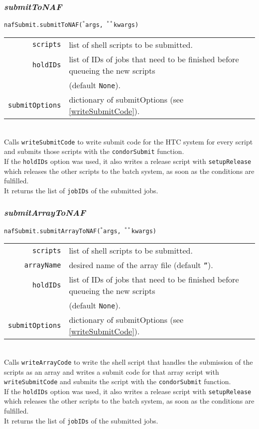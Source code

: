 \documentclass[12pt, a4paper]{article}
\newcommand{\args}{$^*$args}
\newcommand{\kwargs}{$^{**}$kwargs}
\begin{document}
\subsubsection{\textit{submitToNAF}}
\texttt{nafSubmit.submitToNAF(\args, \kwargs)}\\
\begin{tabular}{r|l}
\hline
\texttt{scripts}		&	list of shell scripts to be submitted.\\
\texttt{holdIDs}		&	list of IDs of jobs that need to be finished before queueing the new scripts\\
						& 	(default \texttt{None}).\\
\texttt{submitOptions}	&	dictionary of submitOptions (see \ref{writeSubmitCode}).\\
\hline
\end{tabular}
\\
Calls \texttt{writeSubmitCode} to write submit code for the HTC system for every script and submits those scripts with the \texttt{condorSubmit} function.\\
If the \texttt{holdIDs} option was used, it also writes a release script with \texttt{setupRelease} which releases the other scripts to the batch system, as soon as the conditions are fulfilled.\\
It returns the list of \texttt{jobIDs} of the submitted jobs.

\subsubsection{\textit{submitArrayToNAF}}
\texttt{nafSubmit.submitArrayToNAF(\args, \kwargs)}\\
\begin{tabular}{r|l}
\hline
\texttt{scripts}		&	list of shell scripts to be submitted.\\
\texttt{arrayName}		&	desired name of the array file (default \texttt{''}).\\
\texttt{holdIDs}		&	list of IDs of jobs that need to be finished before queueing the new scripts\\
						& 	(default \texttt{None}).\\
\texttt{submitOptions}	&	dictionary of submitOptions (see \ref{writeSubmitCode}).\\
\hline
\end{tabular}
\\
Calls \texttt{writeArrayCode} to write the shell script that handles the submission of the scripts as an array and writes a submit code for that array script with \texttt{writeSubmitCode} and submits the script with the \texttt{condorSubmit} function.\\
If the \texttt{holdIDs} option was used, it also writes a release script with \texttt{setupRelease} which releases the other scripts to the batch system, as soon as the conditions are fulfilled.\\
It returns the list of \texttt{jobIDs} of the submitted jobs.
\end{document}
